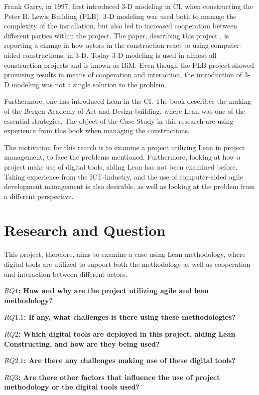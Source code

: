 Frank Garry, in 1997, first introduced 3-D modeling in CI, when constructing the Peter B. Lewis Building (PLB). 3-D modeling was used both to manage the complexity of the installation, but also led to increased cooperation between different parties within the project. The paper, describing this project \cite{frank_garry}, is reporting a change in how actors in the construction react to using computer-aided constructions, in 3-D. Today 3-D modeling is used in almost all construction projects and is known as BiM. Even though the PLB-project showed promising results in means of cooperation and interaction, the introduction of 3-D modeling was not a single solution to the problem.

Furthermore, one has introduced Lean in the CI. The book \cite{lean_i_praksis} describes the making of the Bergen Academy of Art and Design-building, where Lean was one of the essential strategies. The object of the Case Study in this research are using experience from this book when managing the constructions. 

The motivation for this rearch is to examine a project utilizing Lean in project management, to face the problems mentioned. Furthermore, looking at how a project make use of digital tools, aiding Lean has not been examined before. Taking experience from the ICT-industry, and the use of computer-aided agile development management is also desirable, as well as looking at the problem from a different perspective.

\section{Research and Question} \label{sec:research}
This project, therefore, aims to examine a case using Lean methodology, where digital tools are utilized to support both the methodology as well as cooperation and interaction between different actors.

{\bf $RQ1$: How and why are the project utilizing agile and lean methodology?}

{\bf $RQ1.1$: If any, what challenges is there using these methodologies?}

{\bf $RQ2$: Which digital tools are deployed in this project, aiding Lean Constructing, and how are they being used?}

{\bf $RQ2.1$: Are there any challenges making use of these digital tools?}

{\bf $RQ3$: Are there other factors that influence the use of project methodology or the digital tools used?}


